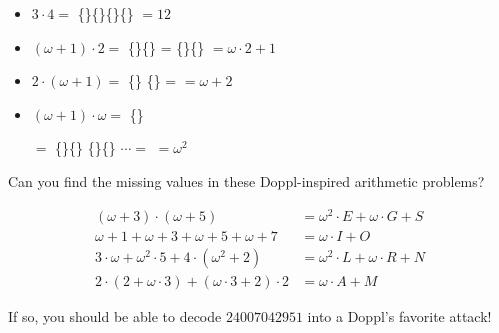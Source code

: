 \begin{itemize}
\item \(3\cdot 4=\)
\{\mappDoppl\mappDoppl\mappDoppl\}\{\mappDoppl\mappDoppl\mappDoppl\}\{\mappDoppl\mappDoppl\mappDoppl\}\{\mappDoppl\mappDoppl\mappDoppl\} \(=12\)

\item \((\omega+1)\cdot 2=\)
\{\mappDopplOmega\mappDoppl\}\{\mappDopplOmega\mappDoppl\} =
\{\mappDopplOmega\}\{\mappDoppl\mappDopplOmega\}\mappDoppl{} \(=\omega\cdot 2+1\)

\item \(2\cdot(\omega+1)=\)
\{\mappDoppl\mappDoppl\}%
\resizebox{0.4in}{!}{\{\mappDoppl\mappDoppl\}}%
\resizebox{0.3in}{!}{\{\mappDoppl\mappDoppl\}}%
\resizebox{0.2in}{!}{\{\mappDoppl\mappDoppl\}}%
\resizebox{0.1in}{!}{\{\mappDoppl\mappDoppl\}}%
\{\mappDoppl\mappDoppl\} =
\mappDopplOmega\mappDoppl\mappDoppl \(=\omega+2\)

\item \((\omega+1)\cdot \omega=\)
\{\mappDopplOmega\mappDoppl\}%
\resizebox{0.6in}{!}{\{\mappDopplOmega\mappDoppl\}}%
\resizebox{0.5in}{!}{\{\mappDopplOmega\mappDoppl\}}%
\resizebox{0.4in}{!}{\{\mappDopplOmega\mappDoppl\}}%
\resizebox{0.3in}{!}{\{\mappDopplOmega\mappDoppl\}}%
\resizebox{0.2in}{!}{\{\mappDopplOmega\mappDoppl\}}%
\resizebox{0.1in}{!}{\{\mappDopplOmega\mappDoppl\}}%

\hspace{0.7in}
\(=\)
\{\mappDopplOmega\}\{\mappDoppl\mappDopplOmega\}%
\{\mappDoppl\mappDopplOmega\}\{\mappDoppl\mappDopplOmega\}%
\(\cdots =\)
\mappDopplOmegaSquared \(=\omega^2\)
\end{itemize}


Can you find the missing values in these Doppl-inspired arithmetic problems?

\begin{align*}
  (\omega+3)\cdot(\omega+5)&=\omega^2\cdot E+\omega\cdot G+S \\
  \omega+1+\omega+3+\omega+5+\omega+7&=\omega\cdot I+O \\
  3\cdot\omega+\omega^2\cdot 5+4\cdot(\omega^2+2)&=
        \omega^2\cdot L+\omega\cdot R+N \\
  2\cdot(2+\omega\cdot3)+(\omega\cdot3+2)\cdot2&=
        \omega\cdot A+M
\end{align*}

If so, you should be able to decode \(24007042951\) into a Doppl's
favorite \mappMobimon{} attack! %

